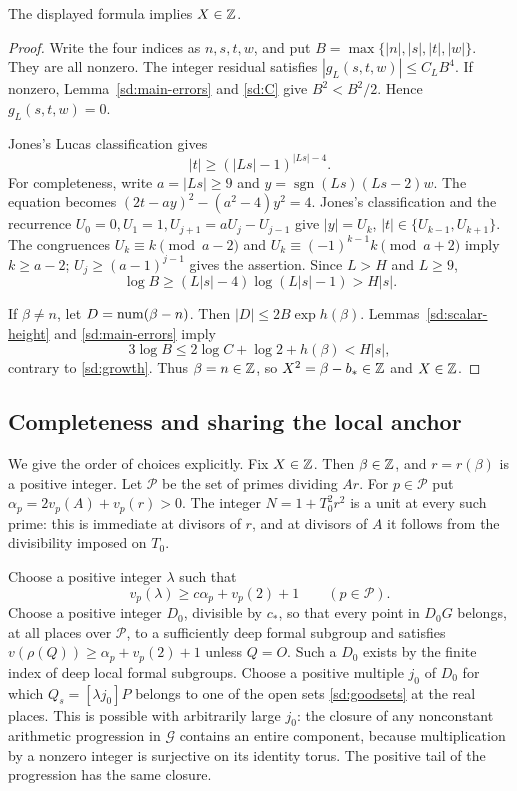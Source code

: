 \begin{sdproposition}\label{sd:soundness}
The displayed formula implies $X\in\mathbb Z$.
\end{sdproposition}
\begin{proof}
Write the four indices as $n,s,t,w$, and put $B=\max\{|n|,|s|,|t|,|w|\}$.
They are all nonzero. The integer residual satisfies
$|g_L(s,t,w)|\le C_LB^4$. If nonzero, Lemma~\ref{sd:main-errors} and
\eqref{sd:C} give $B^2<B^2/2$. Hence $g_L(s,t,w)=0$.

Jones's Lucas classification \cite[Corollary~2.7]{JonesLucas2003} gives
\[
 |t|\ge(|Ls|-1)^{|Ls|-4}.
\]
For completeness, write $a=|Ls|\ge9$ and
$y=\operatorname{sgn}(Ls)(Ls-2)w$. The equation becomes
$(2t-ay)^2-(a^2-4)y^2=4$. Jones's classification and the recurrence
$U_0=0,U_1=1,U_{j+1}=aU_j-U_{j-1}$ give
$|y|=U_k$, $|t|\in\{U_{k-1},U_{k+1}\}$.
The congruences $U_k\equiv k\pmod{a-2}$ and
$U_k\equiv(-1)^{k-1}k\pmod{a+2}$ imply $k\ge a-2$;
$U_j\ge(a-1)^{j-1}$ gives the assertion. Since $L>H$ and $L\ge9$,
\begin{equation}\label{sd:growth}
 \log B\ge(L|s|-4)\log(L|s|-1)>H|s|.
\end{equation}

If $\beta\ne n$, let $D=\operatorname{num}(\beta-n)$. Then
$|D|\le2B\exp h(\beta)$. Lemmas~\ref{sd:scalar-height} and
\ref{sd:main-errors} imply
\[
 3\log B\le 2\log C+\log2+h(\beta)<H|s|,
\]
contrary to \eqref{sd:growth}. Thus $\beta=n\in\mathbb Z$, so
$X^2=\beta-b_*\in\mathbb Z$ and $X\in\mathbb Z$.
\end{proof}

\subsection{Completeness and sharing the local anchor}

We give the order of choices explicitly. Fix $X\in\mathbb Z$.
Then $\beta\in\mathbb Z$, and $r=r(\beta)$ is a positive integer.
Let $\mathcal P$ be the set of primes dividing $Ar$. For $p\in\mathcal P$
put $\alpha_p=2v_p(A)+v_p(r)>0$. The integer $N=1+T_0^2r^2$ is a unit
at every such prime: this is immediate at divisors of $r$, and at divisors
of $A$ it follows from the divisibility imposed on $T_0$.

Choose a positive integer $\lambda$ such that
\[
 v_p(\lambda)\ge c\alpha_p+v_p(2)+1\qquad(p\in\mathcal P).
\]
Choose a positive integer $D_0$, divisible by $c_*$, so that every point
in $D_0G$ belongs, at all places over $\mathcal P$, to a sufficiently deep
formal subgroup and satisfies
$v(\rho(Q))\ge\alpha_p+v_p(2)+1$ unless $Q=O$.
Such a $D_0$ exists by the finite index of deep local formal subgroups.
Choose a positive multiple $j_0$ of $D_0$ for which
$Q_s=[\lambda j_0]P$ belongs to one of the open sets
\eqref{sd:goodsets} at the real places. This is possible with arbitrarily
large $j_0$: the closure of any nonconstant arithmetic progression in
$\mathcal G$ contains an entire component, because multiplication by a
nonzero integer is surjective on its identity torus. The positive tail of
the progression has the same closure.

